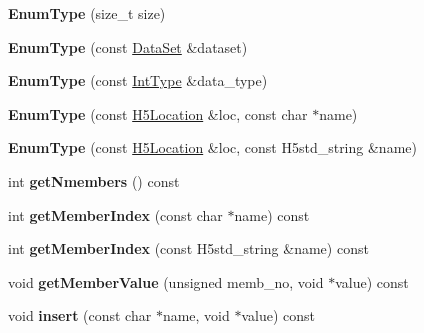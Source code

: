\begin{DoxyCompactItemize}
{\bfseries Enum\+Type} (size\+\_\+t size)
\item 
\mbox{\label{class_h5_1_1_enum_type_a22618bff56623043a64afafb1b6acdca}} 
{\bfseries Enum\+Type} (const \hyperlink{class_h5_1_1_data_set}{Data\+Set} \&dataset)
\item 
\mbox{\label{class_h5_1_1_enum_type_afc61afae0268090c874fe384f56ae1f5}} 
{\bfseries Enum\+Type} (const \hyperlink{class_h5_1_1_int_type}{Int\+Type} \&data\+\_\+type)
\item 
\mbox{\label{class_h5_1_1_enum_type_afdee85da8ecd157c6b708dd584538a42}} 
{\bfseries Enum\+Type} (const \hyperlink{class_h5_1_1_h5_location}{H5\+Location} \&loc, const char $\ast$name)
\item 
\mbox{\label{class_h5_1_1_enum_type_ac58706f0a9df3206c4f6f5ee17b35578}} 
{\bfseries Enum\+Type} (const \hyperlink{class_h5_1_1_h5_location}{H5\+Location} \&loc, const H5std\+\_\+string \&name)
\item 
\mbox{\label{class_h5_1_1_enum_type_ab376b82cb30720d40796039b8ca3953f}} 
int {\bfseries get\+Nmembers} () const
\item 
\mbox{\label{class_h5_1_1_enum_type_ad4a24c289edd87394755c5fbfdb0cd95}} 
int {\bfseries get\+Member\+Index} (const char $\ast$name) const
\item 
\mbox{\label{class_h5_1_1_enum_type_a8a235a8042ddb8d7a94e429830843c45}} 
int {\bfseries get\+Member\+Index} (const H5std\+\_\+string \&name) const
\item 
\mbox{\label{class_h5_1_1_enum_type_a910e46db41ff139bece3993ae74fc19d}} 
void {\bfseries get\+Member\+Value} (unsigned memb\+\_\+no, void $\ast$value) const
\item 
\mbox{\label{class_h5_1_1_enum_type_a7158d518f2be8c2b1478d15cae6d423b}} 
void {\bfseries insert} (const char $\ast$name, void $\ast$value) const
\item 
\mbox{\label{class_h5_1_1_enum_type_a4b7fdea2ad0086bc6af6e04e80de6319}} 

\end{DoxyCompactItemize}
